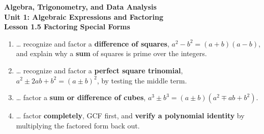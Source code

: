 \documentclass[10pt]{article}
\begin{document}
\vspace{-0.8in}

\begin{center}
  {\color{white}\textbf{\LARGE Algebra, Trigonometry, and Data Analysis}}\\[4pt]
  {\color{mistmid}\large\textbf{Unit 1: Algebraic Expressions and Factoring}}\\[6pt]
  {\color{white}\textbf{\large Lesson 1.5 \quad Factoring Special Forms}}
\end{center}

\vspace{0.22in}
\namedateperiod
\vspace{0.18in}

\begin{learningtargetbox}
\small
\begin{enumerate}[leftmargin=1.5em, itemsep=5pt]
  \item \ldots{} recognize and factor a \textbf{difference of squares}, $a^2-b^2 = (a+b)(a-b)$, and
        explain why a \textbf{sum} of squares is prime over the integers.
  \item \ldots{} recognize and factor a \textbf{perfect square trinomial},
        $a^2 \pm 2ab + b^2 = (a \pm b)^2$, by testing the middle term.
  \item \ldots{} factor a \textbf{sum or difference of cubes},
        $a^3 \pm b^3 = (a \pm b)(a^2 \mp ab + b^2)$.
  \item \ldots{} factor \textbf{completely}, GCF first, and \textbf{verify a polynomial identity} by
        multiplying the factored form back out.
\end{enumerate}
\end{learningtargetbox}

\vspace{0.14in}
\end{document}
